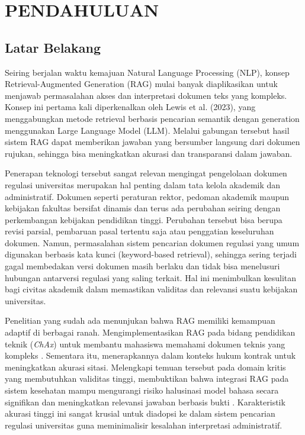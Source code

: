 \chapter{PENDAHULUAN}
\label{BAB1:pendahuluan}

\section{Latar Belakang}
 Seiring berjalan waktu kemajuan Natural Language Processing (NLP), konsep Retrieval-Augmented Generation (RAG) mulai banyak diaplikasikan untuk menjawab permasalahan akses dan interpretasi dokumen teks yang kompleks. 
 Konsep ini pertama kali diperkenalkan oleh Lewis et al. (2023), yang menggabungkan metode retrieval berbasis pencarian semantik dengan generation menggunakan Large Language Model (LLM). Melalui gabungan tersebut hasil 
 sistem RAG dapat memberikan jawaban yang bersumber langsung dari dokumen rujukan, sehingga bisa meningkatkan akurasi dan transparansi dalam jawaban.

 Penerapan teknologi tersebut sangat relevan mengingat pengelolaan dokumen regulasi universitas merupakan hal penting dalam tata kelola akademik dan administratif. Dokumen seperti peraturan rektor, pedoman akademik maupun 
 kebijakan fakultas bersifat dinamis dan terus ada perubahan seiring dengan perkembangan kebijakan pendidikan tinggi. Perubahan tersebut bisa berupa revisi parsial, pembaruan pasal tertentu saja atau penggatian keseluruhan dokumen. 
 Namun, permasalahan sistem pencarian dokumen regulasi yang umum digunakan berbasis kata kunci (keyword-based retrieval), sehingga sering terjadi gagal membedakan versi dokumen masih berlaku dan tidak bisa menelusuri hubungan antarversi regulasi yang saling terkait. Hal ini menimbulkan kesulitan bagi civitas akademik dalam memastikan validitas dan relevansi suatu kebijakan universitas.

 Penelitian yang sudah ada menunjukan bahwa RAG memiliki kemampuan adaptif di berbagai ranah. Mengimplementasikan RAG pada bidang pendidikan teknik (\textit{ChAx}) untuk membantu mahasiswa memahami dokumen teknis yang kompleks \cite{Steininger2025}. Sementara itu, \cite{Amazou2025} menerapkannya dalam konteks hukum kontrak untuk meningkatkan akurasi sitasi. 
 Melengkapi temuan tersebut pada domain kritis yang membutuhkan validitas tinggi, membuktikan bahwa integrasi RAG pada sistem kesehatan mampu mengurangi risiko halusinasi model bahasa secara signifikan dan meningkatkan relevansi jawaban berbasis bukti \cite{Samudra2025}. Karakteristik akurasi tinggi ini sangat krusial untuk diadopsi ke dalam sistem pencarian regulasi universitas guna meminimalisir kesalahan interpretasi administratif.

